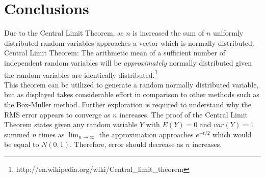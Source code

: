 \section{Conclusions} 
Due to the Central Limit Theorem, as $n$ is increased the sum of $n$ uniformly distributed random variables approaches a vector which is normally distributed. Central Limit Theorem: The arithmetic mean of a sufficient number of independent random variables will be \textit{approximately} normally distributed given the random variables are identically distributed.\footnote{http://en.wikipedia.org/wiki/Central\_limit\_theorem} \\ 

This theorem can be utilized to generate a random normally distributed variable, but as displayed takes considerable effort in comparison to other methods such as the Box-Muller method. Further exploration is required to understand why the RMS error appears to converge as $n$ increases. The proof of the Central Limit Theorem states given any random variable $Y$ with $E(Y) = 0$ and $var(Y) = 1$ summed $n$ times as $\lim_{n \to \infty}$ the approximation approaches $e^{-t/2}$ which would be equal to $N(0, 1)$. Therefore, error should decrease as $n$ increases. 

